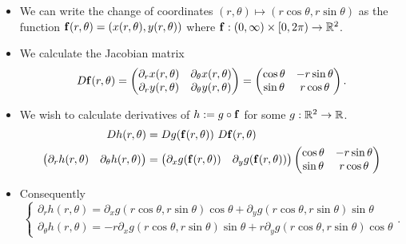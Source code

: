 \begin{itemize}
    \item
          We can write the change of coordinates
          \((r,\theta) \mapsto (r\cos \theta, r\sin \theta)\)
          as the function  \(\mathbf{f}(r,\theta) = (x(r,\theta),y(r,\theta))\) where \(\mathbf{f}:(0,\infty)\times [0,2\pi) \to \mathbb{R}^2\).
    \item
          We calculate the Jacobian matrix
          \[
              D\mathbf{f}(r,\theta) =
              \begin{pmatrix}
                  \partial_{r}x(r,\theta) & \partial_{\theta}x(r,\theta) \\
                  \partial_{r}y(r,\theta) & \partial_{\theta}y(r,\theta)
              \end{pmatrix}
              =
              \begin{pmatrix}
                  \cos \theta & -r\sin \theta \\
                  \sin \theta & r\cos \theta
              \end{pmatrix}.
          \]
    \item
          We wish to calculate derivatives of \(h := g \circ \mathbf{f}\) for some  \(g:\mathbb{R}^2 \to \mathbb{R}\).
          \[
              \begin{aligned}
                  Dh(r,\theta) & = Dg(\ff(r,\theta)) \ D\ff(r,\theta) \\
                  \begin{pmatrix}
                      \partial_r h(r,\theta) & \partial_\theta h(r,\theta)
                  \end{pmatrix}
                               & =
                  \begin{pmatrix}
                      \partial_x g(\ff(r,\theta)) & \partial_y g(\ff(r,\theta))
                  \end{pmatrix}
                  \begin{pmatrix}
                      \cos \theta & -r\sin \theta \\
                      \sin \theta & r\cos \theta
                  \end{pmatrix}
              \end{aligned}
          \]

    \item Consequently
          \[
              \begin{cases}
                  \partial_r h(r,\theta) = \partial_x g(r\cos \theta, r\sin \theta) \cos \theta + \partial_y g(r\cos \theta, r\sin \theta)\sin \theta \\
                  \partial_\theta h(r,\theta) = - r \partial_x g(r\cos \theta, r\sin \theta) \sin \theta +  r \partial_y g(r\cos \theta, r\sin \theta)\cos \theta
              \end{cases}.
          \]
\end{itemize}






